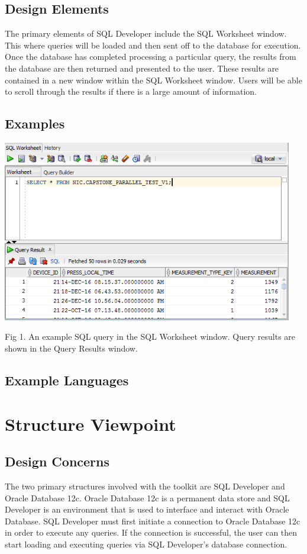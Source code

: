 \documentclass[draftclsnofoot, onecolumn, compsoc, 10pt]{IEEEtran}
\begin{document}
\subsection{Design Elements}
The primary elements of SQL Developer include the SQL Worksheet window.
This where queries will be loaded and then sent off to the database for execution.
Once the database has completed processing a particular query, the results from the database are then returned and presented to the user. 
These results are contained in a new window within the SQL Worksheet window.
Users will be able to scroll through the results if there is a large amount of information.

\subsection{Examples}
\begin{center}
	\includegraphics[width=5in]{sql_worksheet_example.png}

	Fig 1. An example SQL query in the SQL Worksheet window. Query results are shown in the Query Results window.
\end{center}

\subsection{Example Languages}

\section{Structure Viewpoint}
\subsection{Design Concerns}
The two primary structures involved with the toolkit are SQL Developer and Oracle Database 12c.
Oracle Database 12c is a permanent data store and SQL Developer is an environment that is used to interface and interact with Oracle Database.
SQL Developer must first initiate a connection to Oracle Database 12c in order to execute any queries.
If the connection is successful, the user can then start loading and executing queries via SQL Developer's database connection.
\end{document}
